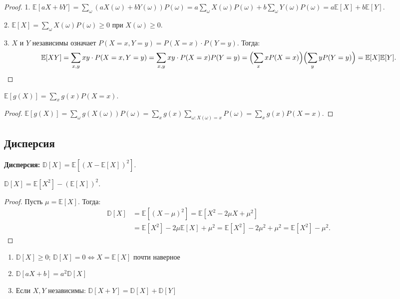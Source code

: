 \documentclass[12pt]{article}
\begin{document}
	\begin{proof}
		1. $\mathbb{E}[aX + bY] = \sum_\omega (aX(\omega) + bY(\omega)) P(\omega) = a \sum_\omega X(\omega) P(\omega) + b \sum_\omega Y(\omega) P(\omega) = a\mathbb{E}[X] + b\mathbb{E}[Y]$.
		
		2. $\mathbb{E}[X] = \sum_\omega X(\omega) P(\omega) \geqslant 0$ при $X(\omega) \geqslant 0$.
		
		3. $X$ и $Y$ независимы означает $P(X = x, Y = y) = P(X = x) \cdot P(Y = y)$. Тогда:
		\[\mathbb{E}[XY] = \sum_{x,y} xy \cdot P(X=x, Y=y) = \sum_{x,y} xy \cdot P(X=x) P(Y=y) = \Bigl(\sum_x x P(X=x)\Bigr) \Bigl(\sum_y y P(Y=y)\Bigr) = \mathbb{E}[X]\mathbb{E}[Y].\]
	\end{proof}
	
	\begin{theorem}
		$\mathbb{E}[g(X)] = \sum_x g(x) P(X = x)$.
	\end{theorem}
	
	\begin{proof}
		$\mathbb{E}[g(X)] = \sum_\omega g(X(\omega)) P(\omega) = \sum_x g(x) \sum_{\omega: X(\omega) = x} P(\omega) = \sum_x g(x) P(X = x)$.
	\end{proof}
	
	\subsection{Дисперсия}
	
	\begin{definition}
		\textbf{Дисперсия:} $\mathbb{D}[X] = \mathbb{E}[(X - \mathbb{E}[X])^2]$.
	\end{definition}
	
	\begin{theorem}
		$\mathbb{D}[X] = \mathbb{E}[X^2] - (\mathbb{E}[X])^2$.
	\end{theorem}
	
	\begin{proof}
		Пусть $\mu = \mathbb{E}[X]$. Тогда:
		\begin{align*}
			\mathbb{D}[X] &= \mathbb{E}[(X - \mu)^2] = \mathbb{E}[X^2 - 2\mu X + \mu^2] \\
			&= \mathbb{E}[X^2] - 2\mu \mathbb{E}[X] + \mu^2 = \mathbb{E}[X^2] - 2\mu^2 + \mu^2 = \mathbb{E}[X^2] - \mu^2.
		\end{align*}
	\end{proof}
	
	\begin{theorem}
		\begin{enumerate}
			\item $\mathbb{D}[X] \geqslant 0$; $\mathbb{D}[X] = 0 \Leftrightarrow X = \mathbb{E}[X]$ почти наверное
			\item $\mathbb{D}[aX + b] = a^2 \mathbb{D}[X]$
			\item Если $X, Y$ независимы: $\mathbb{D}[X + Y] = \mathbb{D}[X] + \mathbb{D}[Y]$
		\end{enumerate}
	\end{theorem}
	
\end{document}
